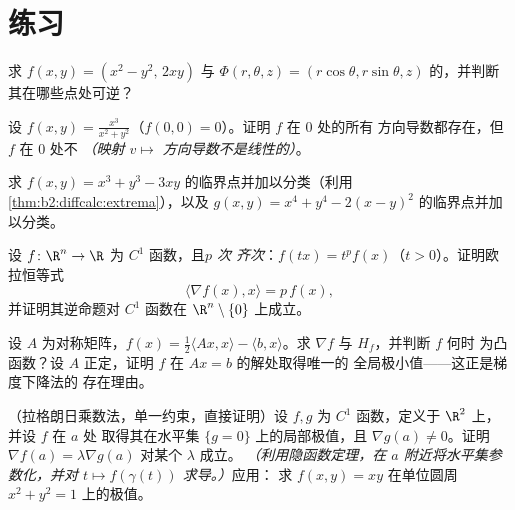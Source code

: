 \section{练习}

\begin{exercise}[$\star$]\label{exo:b2:diffcalc:1}
求 $f(x,y) = (x^2 - y^2,\, 2xy)$ 与
$\Phi(r,\theta,z) = (r\cos\theta, r\sin\theta, z)$ 的，并判断
其在哪些点处可逆？
\end{exercise}

\begin{exercise}[$\star$]\label{exo:b2:diffcalc:2}
设 $f(x,y) = \frac{x^3}{x^2 + y^2}$（$f(0,0) = 0$）。证明 $f$ 在 $0$ 处的所有
方向导数都存在，但 $f$ 在 $0$ 处不
\emph{（映射 $v \mapsto$
方向导数不是线性的）}。
\end{exercise}

\begin{exercise}[$\star$]\label{exo:b2:diffcalc:3}
求 $f(x, y) = x^3 + y^3 -
3xy$ 的临界点并加以分类（利用\cref{thm:b2:diffcalc:extrema}），以及 $g(x,y) = x^4 +
y^4 - 2(x - y)^2$ 的临界点并加以分类。
\end{exercise}

\begin{exercise}[$\star\star$]\label{exo:b2:diffcalc:4}
设 $f \colon \R^n \to \R$ 为 $C^1$ 函数，且\emph{$p$ 次
齐次}：$f(tx) = t^pf(x)$（$t > 0$）。证明欧拉恒等式
\[
\langle \nabla f(x), x\rangle = p\,f(x) ,
\]
并证明其逆命题对 $C^1$ 函数在 $\R^n\setminus\{0\}$ 上成立。
\end{exercise}

\begin{exercise}[$\star\star$]\label{exo:b2:diffcalc:5}
设 $A$ 为对称矩阵，$f(x) = \frac12\langle Ax, x\rangle -
\langle b, x\rangle$。求 $\nabla f$ 与 $H_f$，并判断 $f$ 何时
为凸函数？设 $A$ 正定，证明 $f$ 在 $Ax = b$ 的解处取得唯一的
全局极小值——这正是梯度下降法的
存在理由。
\end{exercise}

\begin{exercise}[$\star\star$]\label{exo:b2:diffcalc:6}
（拉格朗日乘数法，单一约束，直接证明）设 $f, g$ 为 $C^1$
函数，定义于 $\R^2$ 上，并设 $f$ 在 $a$ 处
取得其在水平集 $\{g = 0\}$ 上的局部极值，且 $\nabla g(a) \neq 0$。证明
$\nabla f(a) = \lambda\nabla g(a)$ 对某个 $\lambda$ 成立。
\emph{（利用隐函数定理，在 $a$ 附近将水平集参数化，并对
$t \mapsto f(\gamma(t))$ 求导。）}应用：
求 $f(x,y) = xy$ 在单位圆周 $x^2 + y^2 = 1$ 上的极值。
\end{exercise}

